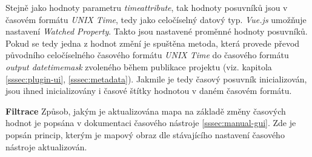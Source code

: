Stejně jako hodnoty parametru \textit{time\textunderscore attribute},
tak hodnoty posuvníků jsou v časovém formátu \textit{UNIX Time}, tedy
jako celočíselný datový typ. \textit{Vue.js} umožňuje nastavení
\textit{Watched Property}. Takto jsou nastavené proměnné hodnoty
posuvníků. Pokud se tedy jedna z hodnot změní je spuštěna metoda,
která provede převod původního celočíselného časového formátu
\textit{UNIX Time} do časového formátu \textit{output\textunderscore
datetime\textunderscore mask} zvoleného během publikace projektu
(viz. kapitola \ref{sssec:plugin-ui}, \ref{sssec:metadata}). Jakmile je tedy
časový posuvník inicializován, jsou ihned inicializovány i časové
štítky hodnotou v daném časovém formátu.

\bigskip
\noindent \textbf{Filtrace}
Způsob, jakým je aktualizována mapa na základě změny časových hodnot je
popsána v dokumentaci časového nástroje \ref{sssec:manual-gui}. Zde je popsán princip, kterým je
mapový obraz dle stávajícího nastavení časového nástroje aktualizován.

